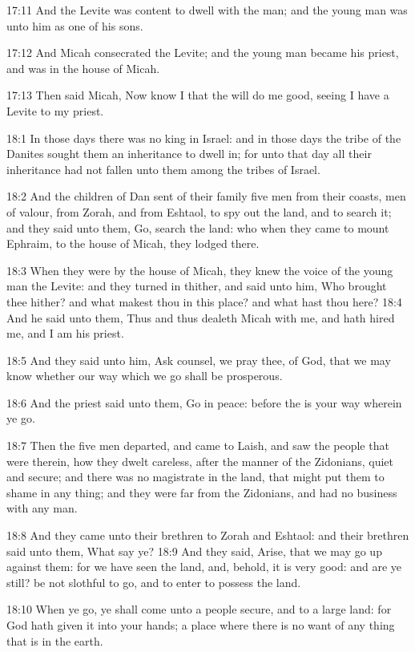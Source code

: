 17:11 And the Levite was content to dwell with the man; and the young man was unto him as one of his sons.

17:12 And Micah consecrated the Levite; and the young man became his priest, and was in the house of Micah.

17:13 Then said Micah, Now know I that the \LORD will do me good, seeing I have a Levite to my priest.

18:1 In those days there was no king in Israel: and in those days the tribe of the Danites sought them an inheritance to dwell in; for unto that day all their inheritance had not fallen unto them among the tribes of Israel.

18:2 And the children of Dan sent of their family five men from their coasts, men of valour, from Zorah, and from Eshtaol, to spy out the land, and to search it; and they said unto them, Go, search the land: who when they came to mount Ephraim, to the house of Micah, they lodged there.

18:3 When they were by the house of Micah, they knew the voice of the young man the Levite: and they turned in thither, and said unto him, Who brought thee hither? and what makest thou in this place? and what hast thou here?  18:4 And he said unto them, Thus and thus dealeth Micah with me, and hath hired me, and I am his priest.

18:5 And they said unto him, Ask counsel, we pray thee, of God, that we may know whether our way which we go shall be prosperous.

18:6 And the priest said unto them, Go in peace: before the \LORD is your way wherein ye go.

18:7 Then the five men departed, and came to Laish, and saw the people that were therein, how they dwelt careless, after the manner of the Zidonians, quiet and secure; and there was no magistrate in the land, that might put them to shame in any thing; and they were far from the Zidonians, and had no business with any man.

18:8 And they came unto their brethren to Zorah and Eshtaol: and their brethren said unto them, What say ye?  18:9 And they said, Arise, that we may go up against them: for we have seen the land, and, behold, it is very good: and are ye still? be not slothful to go, and to enter to possess the land.

18:10 When ye go, ye shall come unto a people secure, and to a large land: for God hath given it into your hands; a place where there is no want of any thing that is in the earth.

